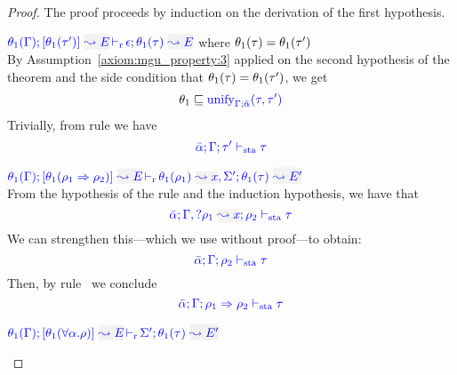 \begin{proof}
The proof proceeds by induction on the derivation of the first hypothesis.
\begin{description}
\setlength{\itemsep}{1em}
\item[\fbox{\rref{M-Simp}}]\quad
$\dmres{\theta_1(\tenv)}{\theta_1(\type')}{E}{\theta_1(\type)}{E}{\epsilon}$ \quad where $\theta_1(\tau) = \theta_1(\tau')$ \\

By Assumption~\ref{axiom:mgu_property:3} applied on the second hypothesis of the theorem
and the side condition that $\theta_1(\tau) = \theta_1(\tau')$, we get
\begin{equation*}
  \theta_1\sqsubseteq{\color{blue} \mathrm{unify}_{\Gamma;\bar{\alpha}}(\tau,\tau')}
\end{equation*}
Trivially, from rule  we have
\begin{equation*}
  {\color{blue} \bar\alpha; \Gamma; \tau' \vdash_{\mathrm{sta}}\tau}
\end{equation*}

\item[\fbox{\rref{M-IApp}}]\quad
$\dmres{\theta_1(\tenv)}{\theta_1(\rulet_1\To\rulet_2)}{E}{\theta_1(\type)}{E'}{\ie{\theta_1(\rulet_1)}{x},\Sigma'}$\ \\

  From the hypothesis of the rule and the induction hypothesis, we have that
\begin{equation*}
\coherent{\bar{\alpha}}{\tenv,\envi{\rulet_1}{x}}{\rulet_2}{\type}
\end{equation*}
We can strengthen this---which we use without proof---to obtain:
\begin{equation*}
{\color{blue} \bar{\alpha}; \Gamma; \rho_2 \vdash_{\mathrm{sta}}\tau}
\end{equation*}
Then, by rule~ we conclude
\begin{equation*}
{\color{blue} \bar{\alpha}; \Gamma; \rho_1 \Rightarrow\rho_2 \vdash_{\mathrm{sta}}\tau}
\end{equation*}

\item[\fbox{\rref{M-TApp}}]\quad
$\dmres{\theta_1(\tenv)}{\theta_1(\tall{\alpha}{\rulet})}{E}{\theta_1(\type)}{E'}{\Sigma'}$\ \\


\end{description}
\end{proof}
